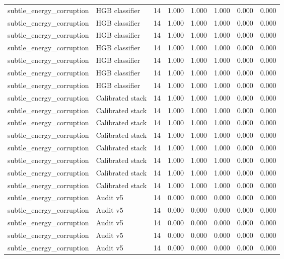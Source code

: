 {\begin{longtable}{llrrrrrr}
subtle\_energy\_corruption & HGB classifier & 14 & 1.000 & 1.000 & 1.000 & 0.000 & 0.000 \\
subtle\_energy\_corruption & HGB classifier & 14 & 1.000 & 1.000 & 1.000 & 0.000 & 0.000 \\
subtle\_energy\_corruption & HGB classifier & 14 & 1.000 & 1.000 & 1.000 & 0.000 & 0.000 \\
subtle\_energy\_corruption & HGB classifier & 14 & 1.000 & 1.000 & 1.000 & 0.000 & 0.000 \\
subtle\_energy\_corruption & HGB classifier & 14 & 1.000 & 1.000 & 1.000 & 0.000 & 0.000 \\
subtle\_energy\_corruption & HGB classifier & 14 & 1.000 & 1.000 & 1.000 & 0.000 & 0.000 \\
subtle\_energy\_corruption & HGB classifier & 14 & 1.000 & 1.000 & 1.000 & 0.000 & 0.000 \\
subtle\_energy\_corruption & Calibrated stack & 14 & 1.000 & 1.000 & 1.000 & 0.000 & 0.000 \\
subtle\_energy\_corruption & Calibrated stack & 14 & 1.000 & 1.000 & 1.000 & 0.000 & 0.000 \\
subtle\_energy\_corruption & Calibrated stack & 14 & 1.000 & 1.000 & 1.000 & 0.000 & 0.000 \\
subtle\_energy\_corruption & Calibrated stack & 14 & 1.000 & 1.000 & 1.000 & 0.000 & 0.000 \\
subtle\_energy\_corruption & Calibrated stack & 14 & 1.000 & 1.000 & 1.000 & 0.000 & 0.000 \\
subtle\_energy\_corruption & Calibrated stack & 14 & 1.000 & 1.000 & 1.000 & 0.000 & 0.000 \\
subtle\_energy\_corruption & Calibrated stack & 14 & 1.000 & 1.000 & 1.000 & 0.000 & 0.000 \\
subtle\_energy\_corruption & Calibrated stack & 14 & 1.000 & 1.000 & 1.000 & 0.000 & 0.000 \\
subtle\_energy\_corruption & Audit v5 & 14 & 0.000 & 0.000 & 0.000 & 0.000 & 0.000 \\
subtle\_energy\_corruption & Audit v5 & 14 & 0.000 & 0.000 & 0.000 & 0.000 & 0.000 \\
subtle\_energy\_corruption & Audit v5 & 14 & 0.000 & 0.000 & 0.000 & 0.000 & 0.000 \\
subtle\_energy\_corruption & Audit v5 & 14 & 0.000 & 0.000 & 0.000 & 0.000 & 0.000 \\
subtle\_energy\_corruption & Audit v5 & 14 & 0.000 & 0.000 & 0.000 & 0.000 & 0.000 \\

\end{longtable}}
